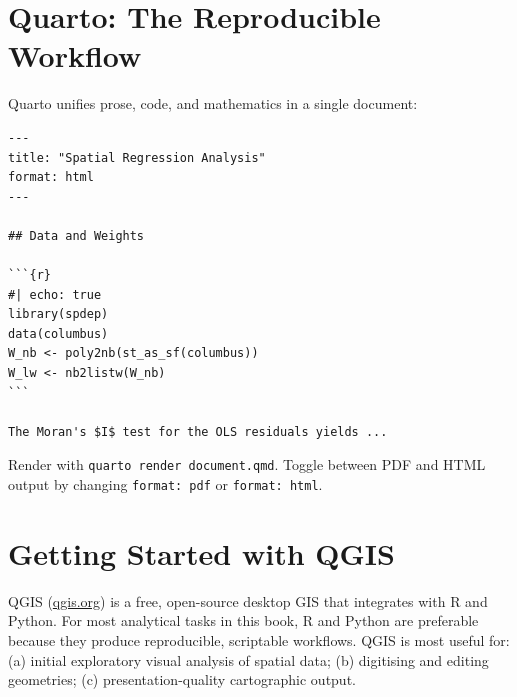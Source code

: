 \section{Quarto: The Reproducible Workflow}

Quarto unifies prose, code, and mathematics in a single document:

\begin{verbatim}
---
title: "Spatial Regression Analysis"
format: html
---

## Data and Weights

```{r}
#| echo: true
library(spdep)
data(columbus)
W_nb <- poly2nb(st_as_sf(columbus))
W_lw <- nb2listw(W_nb)
```

The Moran's $I$ test for the OLS residuals yields ...
\end{verbatim}

Render with \texttt{quarto render document.qmd}. Toggle between PDF and HTML
output by changing \texttt{format: pdf} or \texttt{format: html}.

\section{Getting Started with QGIS}

\textsf{QGIS} (\href{http://www.qgis.org}{qgis.org})
is a free, open-source desktop GIS that integrates with R and Python. For
most analytical tasks in this book, R and Python are preferable because
they produce reproducible, scriptable workflows. QGIS is most useful for:
(a) initial exploratory visual analysis of spatial data; (b) digitising
and editing geometries; (c) presentation-quality cartographic output.

\renewcommand\bibname{Further reading}
\begin{subappendices}


\end{subappendices}
